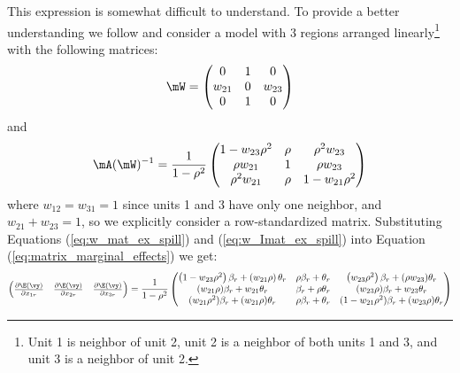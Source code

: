 \documentclass[english,12pt]{book}\usepackage[]{graphicx}\usepackage[]{xcolor}
\begin{document}
This expression is somewhat difficult to understand. To provide a better understanding we follow \cite{elhorst2010applied} and consider a model with 3 regions arranged linearly\footnote{Unit 1 is neighbor of unit 2, unit 2 is a neighbor of both units 1 and 3, and unit 3 is a neighbor of unit 2.} with the following matrices:
\begin{equation}\label{eq:w_mat_ex_spill}
  \mW = \begin{pmatrix}
          0      & 1 & 0 \\
          w_{21} & 0 & w_{23} \\
          0      & 1 & 0
        \end{pmatrix}
\end{equation}
%
and
\begin{equation}\label{eq:w_Imat_ex_spill}
  \mA(\mW)^{-1} = \frac{1}{1 - \rho^2}
  \begin{pmatrix}
          1 - w_{23}\rho^2     & \rho & \rho^2 w_{23}\\
          \rho w_{21} & 1 & \rho w_{23} \\
          \rho^2 w_{21}      & \rho & 1 - w_{21}\rho^2 
        \end{pmatrix}
\end{equation}
%
where $w_{12} = w_{31}= 1$ since units 1 and 3 have only one neighbor, and $w_{21} + w_{23} = 1$, so we explicitly consider a row-standardized matrix.  Substituting Equations (\ref{eq:w_mat_ex_spill}) and (\ref{eq:w_Imat_ex_spill}) into Equation (\ref{eq:matrix_marginal_effects}) we get:
\begin{equation*}
  \begin{pmatrix}
  \frac{\partial \E(\vy)}{\partial x_{1r}} & \frac{\partial \E(\vy)}{\partial x_{2r}} & \frac{\partial \E(\vy)}{\partial x_{3r}} 
   \end{pmatrix} = \frac{1}{1 - \rho^2}
   \begin{pmatrix}
    \left(1 -  w_{23}\rho^2\right)\beta_r + \left(w_{21}\rho\right) \theta_r & \rho \beta_r + \theta_r & \left(w_{23}\rho^2\right)\beta_r + (\rho w_{23})\theta_r \\
    (w_{21}\rho)\beta_r + w_{21}\theta_r & \beta_r + \rho \theta_r & (w_{23}\rho)\beta_r + w_{23}\theta_r \\
    (w_{21}\rho^2)\beta_r + (w_{21}\rho)\theta_r & \rho \beta_r + \theta_r & (1 -  w_{21}\rho^2)\beta_r + (w_{23}\rho)\theta_r
   \end{pmatrix}
\end{equation*}
\end{document}
